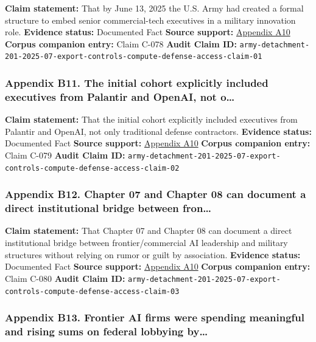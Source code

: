 \documentclass[
  american,
  11pt,
  letterpaper,
]{article}
\begin{document}
\textbf{Claim statement:} That by June 13, 2025 the U.S. Army had
created a formal structure to embed senior commercial-tech executives in
a military innovation role. \textbf{Evidence status:} Documented Fact
\textbf{Source support:}
\hyperref[ch-08-appendix-a10-army-launches-detachment-201-executive-innovation-corps-to-drive-tech-transformation]{Appendix
A10} \textbf{Corpus companion entry:} Claim C-078 \textbf{Audit Claim
ID:}
\texttt{army-detachment-201-2025-07-export-controls-compute-defense-access-claim-01}

\subsubsection{Appendix B11. The initial cohort explicitly included
executives from Palantir and OpenAI, not
o\ldots{}}\label{ch-08-appendix-b11-the-initial-cohort-explicitly-included-executives-from-palantir-and-openai-not-o}

\textbf{Claim statement:} That the initial cohort explicitly included
executives from Palantir and OpenAI, not only traditional defense
contractors. \textbf{Evidence status:} Documented Fact \textbf{Source
support:}
\hyperref[ch-08-appendix-a10-army-launches-detachment-201-executive-innovation-corps-to-drive-tech-transformation]{Appendix
A10} \textbf{Corpus companion entry:} Claim C-079 \textbf{Audit Claim
ID:}
\texttt{army-detachment-201-2025-07-export-controls-compute-defense-access-claim-02}

\subsubsection{Appendix B12. Chapter 07 and Chapter 08 can document a
direct institutional bridge between
fron\ldots{}}\label{ch-08-appendix-b12-chapter-07-and-chapter-08-can-document-a-direct-institutional-bridge-between-fron}

\textbf{Claim statement:} That Chapter 07 and Chapter 08 can document a
direct institutional bridge between frontier/commercial AI leadership
and military structures without relying on rumor or guilt by
association. \textbf{Evidence status:} Documented Fact \textbf{Source
support:}
\hyperref[ch-08-appendix-a10-army-launches-detachment-201-executive-innovation-corps-to-drive-tech-transformation]{Appendix
A10} \textbf{Corpus companion entry:} Claim C-080 \textbf{Audit Claim
ID:}
\texttt{army-detachment-201-2025-07-export-controls-compute-defense-access-claim-03}

\subsubsection{Appendix B13. Frontier AI firms were spending meaningful
and rising sums on federal lobbying
by\ldots{}}\label{ch-08-appendix-b13-frontier-ai-firms-were-spending-meaningful-and-rising-sums-on-federal-lobbying-by}
\end{document}
